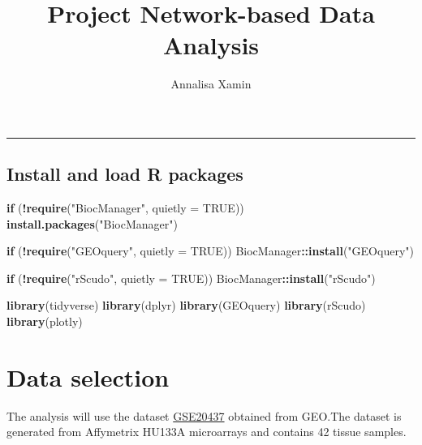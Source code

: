 \documentclass[
]{article}
\title{Project Network-based Data Analysis}
\author{Annalisa Xamin}
\date{}
\newenvironment{Shaded}{\begin{snugshade}}{\end{snugshade}}
\newcommand{\AttributeTok}[1]{\textcolor[rgb]{0.13,0.29,0.53}{#1}}
\newcommand{\ConstantTok}[1]{\textcolor[rgb]{0.56,0.35,0.01}{#1}}
\newcommand{\ControlFlowTok}[1]{\textcolor[rgb]{0.13,0.29,0.53}{\textbf{#1}}}
\newcommand{\FunctionTok}[1]{\textcolor[rgb]{0.13,0.29,0.53}{\textbf{#1}}}
\newcommand{\NormalTok}[1]{#1}
\newcommand{\SpecialCharTok}[1]{\textcolor[rgb]{0.81,0.36,0.00}{\textbf{#1}}}
\newcommand{\StringTok}[1]{\textcolor[rgb]{0.31,0.60,0.02}{#1}}
\begin{document}
\maketitle

{
\setcounter{tocdepth}{2}
\tableofcontents
}
\begin{center}\rule{0.5\linewidth}{0.5pt}\end{center}

\subsection{Install and load R
packages}\label{install-and-load-r-packages}

\begin{Shaded}
\begin{Highlighting}[]
\ControlFlowTok{if}\NormalTok{ (}\SpecialCharTok{!}\FunctionTok{require}\NormalTok{(}\StringTok{"BiocManager"}\NormalTok{, }\AttributeTok{quietly =} \ConstantTok{TRUE}\NormalTok{))}
    \FunctionTok{install.packages}\NormalTok{(}\StringTok{"BiocManager"}\NormalTok{)}

\ControlFlowTok{if}\NormalTok{ (}\SpecialCharTok{!}\FunctionTok{require}\NormalTok{(}\StringTok{"GEOquery"}\NormalTok{, }\AttributeTok{quietly =} \ConstantTok{TRUE}\NormalTok{))}
\NormalTok{    BiocManager}\SpecialCharTok{::}\FunctionTok{install}\NormalTok{(}\StringTok{"GEOquery"}\NormalTok{) }

\ControlFlowTok{if}\NormalTok{ (}\SpecialCharTok{!}\FunctionTok{require}\NormalTok{(}\StringTok{"rScudo"}\NormalTok{, }\AttributeTok{quietly =} \ConstantTok{TRUE}\NormalTok{))}
\NormalTok{    BiocManager}\SpecialCharTok{::}\FunctionTok{install}\NormalTok{(}\StringTok{"rScudo"}\NormalTok{) }

\FunctionTok{library}\NormalTok{(tidyverse)}
\FunctionTok{library}\NormalTok{(dplyr)}
\FunctionTok{library}\NormalTok{(GEOquery)}
\FunctionTok{library}\NormalTok{(rScudo)}
\FunctionTok{library}\NormalTok{(plotly)}
\end{Highlighting}
\end{Shaded}

\section{Data selection}\label{data-selection}

The analysis will use the dataset
\href{https://www.ncbi.nlm.nih.gov/geo/query/acc.cgi?acc=GSE20437}{GSE20437}
obtained from GEO.The dataset is generated from Affymetrix HU133A
microarrays and contains 42 tissue samples.
\end{document}
